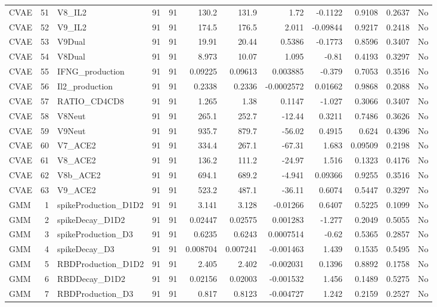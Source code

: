 \begin{longtable}{lrp{}rrrrrrrrl}
CVAE & 51 & V8\_IL2 & 91 & 91 & 130.2 & 131.9 & 1.72 & -0.1122 & 0.9108 & 0.2637 & No \\
CVAE & 52 & V9\_IL2 & 91 & 91 & 174.5 & 176.5 & 2.011 & -0.09844 & 0.9217 & 0.2418 & No \\
CVAE & 53 & V9Dual & 91 & 91 & 19.91 & 20.44 & 0.5386 & -0.1773 & 0.8596 & 0.3407 & No \\
CVAE & 54 & V8Dual & 91 & 91 & 8.973 & 10.07 & 1.095 & -0.81 & 0.4193 & 0.3297 & No \\
CVAE & 55 & IFNG\_production & 91 & 91 & 0.09225 & 0.09613 & 0.003885 & -0.379 & 0.7053 & 0.3516 & No \\
CVAE & 56 & Il2\_production & 91 & 91 & 0.2338 & 0.2336 & -0.0002572 & 0.01662 & 0.9868 & 0.2088 & No \\
CVAE & 57 & RATIO\_CD4CD8 & 91 & 91 & 1.265 & 1.38 & 0.1147 & -1.027 & 0.3066 & 0.3407 & No \\
CVAE & 58 & V8Neut & 91 & 91 & 265.1 & 252.7 & -12.44 & 0.3211 & 0.7486 & 0.3626 & No \\
CVAE & 59 & V9Neut & 91 & 91 & 935.7 & 879.7 & -56.02 & 0.4915 & 0.624 & 0.4396 & No \\
CVAE & 60 & V7\_ACE2 & 91 & 91 & 334.4 & 267.1 & -67.31 & 1.683 & 0.09509 & 0.2198 & No \\
CVAE & 61 & V8\_ACE2 & 91 & 91 & 136.2 & 111.2 & -24.97 & 1.516 & 0.1323 & 0.4176 & No \\
CVAE & 62 & V8b\_ACE2 & 91 & 91 & 694.1 & 689.2 & -4.941 & 0.09366 & 0.9255 & 0.3516 & No \\
CVAE & 63 & V9\_ACE2 & 91 & 91 & 523.2 & 487.1 & -36.11 & 0.6074 & 0.5447 & 0.3297 & No \\
GMM & 1 & spikeProduction\_D1D2 & 91 & 91 & 3.141 & 3.128 & -0.01266 & 0.6407 & 0.5225 & 0.1099 & No \\
GMM & 2 & spikeDecay\_D1D2 & 91 & 91 & 0.02447 & 0.02575 & 0.001283 & -1.277 & 0.2049 & 0.5055 & No \\
GMM & 3 & spikeProduction\_D3 & 91 & 91 & 0.6235 & 0.6243 & 0.0007514 & -0.62 & 0.5365 & 0.2857 & No \\
GMM & 4 & spikeDecay\_D3 & 91 & 91 & 0.008704 & 0.007241 & -0.001463 & 1.439 & 0.1535 & 0.5495 & No \\
GMM & 5 & RBDProduction\_D1D2 & 91 & 91 & 2.405 & 2.402 & -0.002031 & 0.1396 & 0.8892 & 0.1758 & No \\
GMM & 6 & RBDDecay\_D1D2 & 91 & 91 & 0.02156 & 0.02003 & -0.001532 & 1.456 & 0.1489 & 0.5275 & No \\
GMM & 7 & RBDProduction\_D3 & 91 & 91 & 0.817 & 0.8123 & -0.004727 & 1.242 & 0.2159 & 0.2527 & No \\

\end{longtable}
